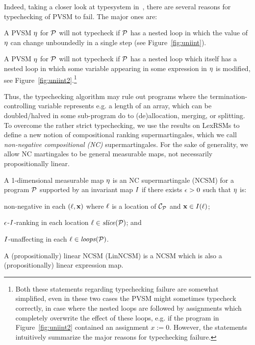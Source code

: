 Indeed, taking a closer look at typesystem in~\cite{HolgerPOPL}, there are several reasons for typechecking of PVSM to fail. The major ones are:
\begin{compactenum}
\item
A PVSM $\eta$ for \PP{} $\mathcal{P}$ will not typecheck if $\mathcal{P}$ has a 
nested loop in which the value of $\eta$ can change unboundedly in a single 
step (see Figure~\ref{fig:uniint}). 
\item
A PVSM $\eta$ for  \PP{} $\mathcal{P}$ will not typecheck if $\mathcal{P}$ has a 
nested loop which itself has a nested loop in which some variable appearing in 
some expression in $\eta$ is modified, see 
Figure~\ref{fig:uniint2}.\footnote{Both these statements regarding typechecking 
failure are somewhat simplified, even in these two cases the PVSM might 
sometimes typecheck correctly, in case where the nested loops are followed by 
assignments which completely overwrite the effect of these loops, e.g. if 
the program in Figure~\ref{fig:uniint2} contained an assignment $x:=0$. 
However, the statements intuitively 
summarize the major reasons for typechecking failure. }
\end{compactenum}



Thus, the typechecking algorithm may rule out programs where the termination-controlling variable represents e.g. a length of an array, which can be doubled/halved in some sub-program do to (de)allocation, merging, or splitting.
To overcome the rather strict typechecking, we use the results on LexRSMs to define a new notion of compositional ranking supermartingales, which we call \emph{non-negative compositional (NC)} supermartingales. For the sake of generality, we allow NC martingales to be general measurable maps, not necessarily propositionally linear.

\begin{definition}
\label{def:nonneg-comp}
A 1-dimensional measurable map $\eta$ is an NC supermartingale (NCSM) for a program $\mathcal{P}$ supported by an invariant map $I$ if there exists $\epsilon>0$ such that $\eta$ is:
\begin{compactenum}
\item  non-negative in each $(\ell,\mathbf{x})$ where $\ell$ is a location of $\mathcal{C}_{\mathcal{P}}$ and $\mathbf{x}\in I(\ell)$;
\item 
 $\epsilon$-$I$-ranking in each location $\ell\in\mathit{slice}{(\mathcal{P})}$; and
\item 
  $I$-unaffecting in each $\ell\in\mathit{loops}(\mathcal{P})$.
\end{compactenum}
A (propositionally) linear NCSM (LinNCSM) is a NCSM which is also a (propositionally) linear expression map.
\end{definition}



